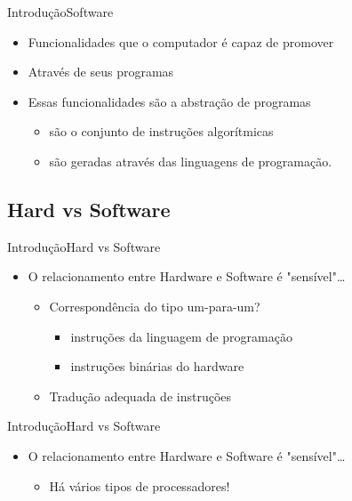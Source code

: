 \documentclass{beamer}
\begin{document}
      \begin{frame}{Introdução}{Software}
        \begin{itemize}
          \item Funcionalidades que o computador é capaz de promover
          \item Através de seus programas
          \item Essas funcionalidades são a abstração de programas
            \begin{itemize}
              \item são o conjunto de instruções algorítmicas 
              \item são geradas através das linguagens de programação.
            \end{itemize}
          \end{itemize}
      \end{frame}

    \subsection{Hard vs Software}

      \begin{frame}{Introdução}{Hard vs Software}
        \begin{itemize}
          \item O relacionamento entre Hardware e Software é "sensível"\dots
            \begin{itemize}
              \item Correspondência do tipo um-para-um?
                \begin{itemize}
                  \item instruções da linguagem de programação 
                  \item instruções binárias do hardware
                \end{itemize}
              \item Tradução adequada de instruções
            \end{itemize}
        \end{itemize}
      \end{frame}

      \begin{frame}{Introdução}{Hard vs Software}
        \begin{itemize}
          \item O relacionamento entre Hardware e Software é "sensível"\dots
            \begin{itemize}
              \item Há vários tipos de processadores!
            \end{itemize}
        \end{itemize}
      \end{frame}
\end{document}
